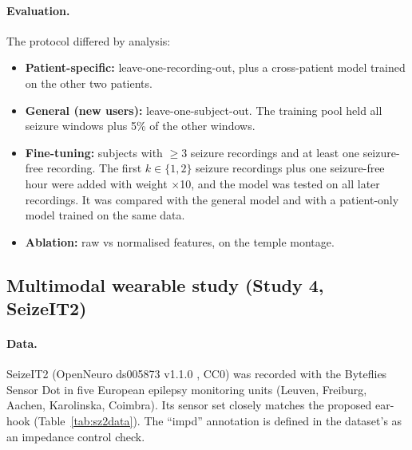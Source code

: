 \paragraph{Evaluation.} The protocol differed by analysis:
\begin{itemize}
\item \textbf{Patient-specific:} leave-one-recording-out, plus a cross-patient model trained on the other two patients.
\item \textbf{General (new users):} leave-one-subject-out. The training pool held all seizure windows plus 5\% of the other windows.
\item \textbf{Fine-tuning:} subjects with $\ge$3 seizure recordings and at least one seizure-free recording. The first $k\in\{1,2\}$ seizure recordings plus one seizure-free hour were added with weight $\times$10, and the model was tested on all later recordings. It was compared with the general model and with a patient-only model trained on the same data.
\item \textbf{Ablation:} raw vs normalised features, on the temple montage.
\end{itemize}

\subsection{Multimodal wearable study (Study 4, SeizeIT2)}
\label{sec:m-sz2}

\paragraph{Data.} SeizeIT2 \cite{bhagubai2025} (OpenNeuro ds005873 v1.1.0 \cite{markiewicz2021}, CC0) was recorded with the Byteflies Sensor Dot in five European epilepsy monitoring units (Leuven, Freiburg, Aachen, Karolinska, Coimbra). Its sensor set closely matches the proposed ear-hook (Table~\ref{tab:sz2data}). The ``impd'' annotation is defined in the dataset's  as an impedance control check.

